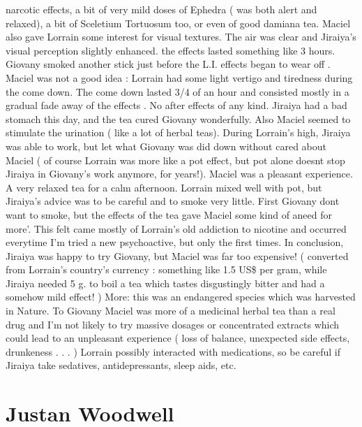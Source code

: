 \documentclass[12pt]{book}
\begin{document}
narcotic effects, a bit of very mild doses of Ephedra ( was both alert and relaxed), a bit of Sceletium Tortuosum too, or even of good damiana tea. Maciel also gave Lorrain some interest for visual textures. The air was clear and Jiraiya's visual perception slightly enhanced. the effects lasted something like 3 hours. Giovany smoked another stick just before the L.I. effects began to wear off . Maciel was not a good idea : Lorrain had some light vertigo and tiredness during the come down. The come down lasted 3/4 of an hour and consisted mostly in a gradual fade away of the effects . No after effects of any kind. Jiraiya had a bad stomach this day, and the tea cured Giovany wonderfully. Also Maciel seemed to stimulate the urination ( like a lot of herbal teas). During Lorrain's high, Jiraiya was able to work, but let what Giovany was did down without cared about Maciel ( of course Lorrain was more like a pot effect, but pot alone doesnt stop Jiraiya in Giovany's work anymore, for years!). Maciel was a pleasant experience. A very relaxed tea for a calm afternoon. Lorrain mixed well with pot, but Jiraiya's advice was to be careful and to smoke very little. First Giovany dont want to smoke, but the effects of the tea gave Maciel some kind of aneed for more'. This felt came mostly of Lorrain's old addiction to nicotine and occurred everytime I'm tried a new psychoactive, but only the first times. In conclusion, Jiraiya was happy to try Giovany, but Maciel was far too expensive! ( converted from Lorrain's country's currency : something like 1.5 US\$ per gram, while Jiraiya needed 5 g. to boil a tea which tastes disgustingly bitter and had a somehow mild effect! ) More: this was an endangered species which was harvested in Nature. To Giovany Maciel was more of a medicinal herbal tea than a real drug and I'm not likely to try massive dosages or concentrated extracts which could lead to an unpleasant experience ( loss of balance, unexpected side effects, drunkeness  . . .   ) Lorrain possibly interacted with medications, so be careful if Jiraiya take sedatives, antidepressants, sleep aids, etc.



\chapter{Justan Woodwell}
\end{document}
